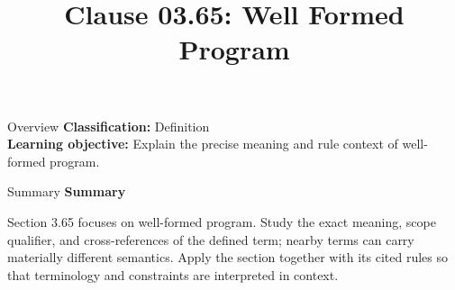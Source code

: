 \documentclass[10pt,letterpaper]{article}
\title{Clause 03.65: Well Formed Program}
\author{}
\date{}
\begin{document}
\maketitle
\begin{CornellOverviewBox}{Overview}
\textbf{Classification:} Definition\\[2pt]
\textbf{Learning objective:} Explain the precise meaning and rule context of well-formed program.
\end{CornellOverviewBox}\begin{CornellSummaryBox}{Summary}
{\sffamily\bfseries\color{Accent} Summary}\par\vspace{3pt}Section 3.65 focuses on well-formed program. Study the exact meaning, scope qualifier, and cross-references of the defined term; nearby terms can carry materially different semantics. Apply the section together with its cited rules so that terminology and constraints are interpreted in context.
\end{CornellSummaryBox}
\end{document}
